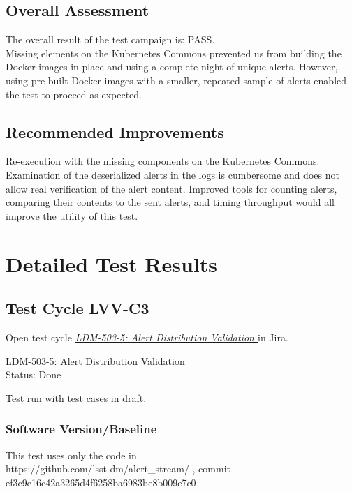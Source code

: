 \documentclass[DM,lsstdraft,STR,toc]{lsstdoc}
\begin{document}
\subsection{Overall Assessment}
\label{sect:overallassessment}

The overall result of the test campaign is:
PASS.\\[2\baselineskip]Missing elements on the Kubernetes Commons
prevented us from building the Docker images in place and using a
complete night of unique alerts. However, using pre-built Docker images
with a smaller, repeated sample of alerts enabled the test to proceed as
expected.


\subsection{Recommended Improvements}
\label{sect:recommendations}

Re-execution with the missing components on the Kubernetes
Commons.\\[2\baselineskip]Examination of the deserialized alerts in the
logs is cumbersome and does not allow real verification of the alert
content. Improved tools for counting alerts, comparing their contents to
the sent alerts, and timing throughput would all improve the utility of
this test.


\newpage
\section{Detailed Test Results}
\label{sect:detailedtestresults}


  \subsection{Test Cycle LVV-C3 }

Open test cycle {\it \href{https://jira.lsstcorp.org/secure/Tests.jspa#/testrun/LVV-C3}{LDM-503-5: Alert Distribution Validation
}} in Jira.

  LDM-503-5: Alert Distribution Validation
\\
  Status: Done

  Test run with test cases in draft.


  \subsubsection{Software Version/Baseline}
    This test uses only the code in\\
https://github.com/lsst-dm/alert\_stream/ , commit
ef3c9e16c42a3265d4f6258ba6983be8b009e7c0
\end{document}

